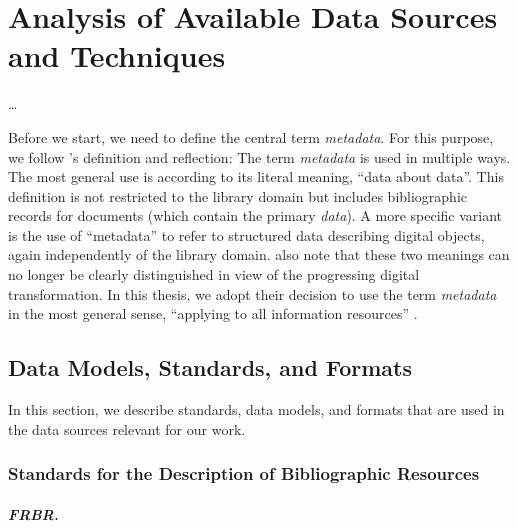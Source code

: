 \chapter{Analysis of Available Data Sources and Techniques}
\label{chap:analysis}


\dots

Before we start, we need to define the central term \emph{metadata}.
For this purpose, we follow \citeauthor{Hider2008}'s \autocite*{Hider2008} definition and reflection:
The term \emph{metadata} is used in multiple ways.
The most general use is according to its literal meaning, \enquote{data about data}.
This definition is not restricted to the library domain
but includes bibliographic records for documents (which contain the primary \emph{data}).
A more specific variant is the use of \enquote{metadata} to refer to
structured data describing digital objects,
again independently of the library domain. \citeauthor{Hider2008} also note that
these two meanings can no longer be clearly distinguished in view of the
progressing digital transformation. In this thesis, we adopt their
decision to use the term \emph{metadata} in the most general sense,
\enquote{applying to all information resources} \autocite[p.13]{Hider2008}.


\section{Data Models, Standards, and Formats}
\label{sec:data_models}


In this section, we describe standards, data models, and formats that are used in the data sources
relevant for our work. 

\subsection{Standards for the Description of Bibliographic Resources}

\paragraph{FRBR.}

